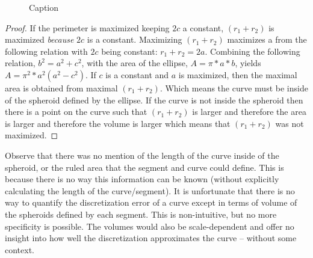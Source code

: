 \begin{figure}[h!]
  \caption{\label{ref:EllipseGeometry} Caption}
\end{figure}

\begin{proof}
If the perimeter is maximized keeping $2c$ a constant, $(r_1 + r_2)$ is 
maximized \textit{because} $2c$ is a constant.  Maximizing $(r_1+r_2)$ 
maximizes a from the following relation with $2c$ being constant: $r_1 + 
r_2 = 2a$.  Combining the following relation, $b^2 = a^2 + c^2$, with the 
area of the ellipse, $A = \pi * a * b$, yields $A=\pi^{2}*a^{2}(a^{2} - 
c^2)$.  If $c$ is a constant and $a$ is maximized, then the maximal area 
is obtained from maximal $(r_1+r_2)$.  Which means the curve must be 
inside of the spheroid defined by the ellipse.  If the curve is not inside 
the spheroid then there is a point on the curve such that $(r_1+r_2)$ is 
larger and therefore the area is larger and therefore the volume is larger 
which means that $(r_1+r_2)$ was not maximized.
\end{proof}

Observe that there was no mention of the length of the curve inside of the 
spheroid, or the ruled area that the segment and curve could define.  
This is because there is no way this information can be known (without 
explicitly calculating the length of the curve/segment).  It is 
unfortunate that there is no way to quantify the discretization error of a 
curve except in terms of volume of the spheroids defined by each segment.  
This is non-intuitive, but no more specificity is possible.  The volumes 
would also be scale-dependent and offer no insight into how well the 
discretization approximates the curve -- without some context.
